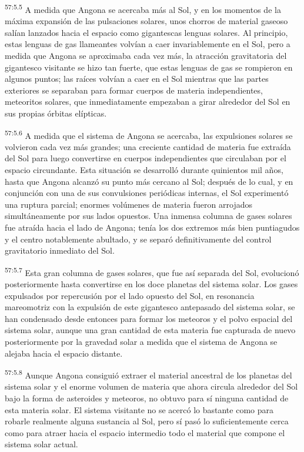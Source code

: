 \par
\textsuperscript{57:5.5} A medida que Angona se acercaba más al Sol, y en los momentos de la máxima expansión de las pulsaciones solares, unos chorros de material gaseoso salían lanzados hacia el espacio como gigantescas lenguas solares. Al principio, estas lenguas de gas llameantes volvían a caer invariablemente en el Sol, pero a medida que Angona se aproximaba cada vez más, la atracción gravitatoria del gigantesco visitante se hizo tan fuerte, que estas lenguas de gas se rompieron en algunos puntos; las raíces volvían a caer en el Sol mientras que las partes exteriores se separaban para formar cuerpos de materia independientes, meteoritos solares, que inmediatamente empezaban a girar alrededor del Sol en sus propias órbitas elípticas.

\par
\textsuperscript{57:5.6} A medida que el sistema de Angona se acercaba, las expulsiones solares se volvieron cada vez más grandes; una creciente cantidad de materia fue extraída del Sol para luego convertirse en cuerpos independientes que circulaban por el espacio circundante. Esta situación se desarrolló durante quinientos mil años, hasta que Angona alcanzó su punto más cercano al Sol; después de lo cual, y en conjunción con una de sus convulsiones periódicas internas, el Sol experimentó una ruptura parcial; enormes volúmenes de materia fueron arrojados simultáneamente por sus lados opuestos. Una inmensa columna de gases solares fue atraída hacia el lado de Angona; tenía los dos extremos más bien puntiagudos y el centro notablemente abultado, y se separó definitivamente del control gravitatorio inmediato del Sol.

\par
\textsuperscript{57:5.7} Esta gran columna de gases solares, que fue así separada del Sol, evolucionó posteriormente hasta convertirse en los doce planetas del sistema solar. Los gases expulsados por repercusión por el lado opuesto del Sol, en resonancia mareomotriz con la expulsión de este gigantesco antepasado del sistema solar, se han condensado desde entonces para formar los meteoros y el polvo espacial del sistema solar, aunque una gran cantidad de esta materia fue capturada de nuevo posteriormente por la gravedad solar a medida que el sistema de Angona se alejaba hacia el espacio distante.

\par
\textsuperscript{57:5.8} Aunque Angona consiguió extraer el material ancestral de los planetas del sistema solar y el enorme volumen de materia que ahora circula alrededor del Sol bajo la forma de asteroides y meteoros, no obtuvo para sí ninguna cantidad de esta materia solar. El sistema visitante no se acercó lo bastante como para robarle realmente alguna sustancia al Sol, pero sí pasó lo suficientemente cerca como para atraer hacia el espacio intermedio todo el material que compone el sistema solar actual.

